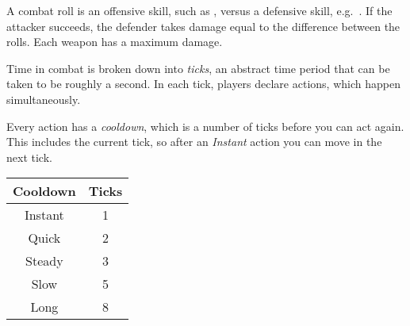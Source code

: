 
A combat roll is an offensive skill, such as , versus a defensive skill, e.g.\ . If the attacker succeeds, the defender takes damage equal to the difference between the rolls. Each weapon has a maximum damage.

Time in combat is broken down into \emph{ticks}, an abstract time period that can be taken to be roughly a second. In each tick, players declare actions, which happen simultaneously.

\begin{multicols}{2}

Every action has a \emph{cooldown}, which is a number of ticks before you can act again. This includes the current tick, so after an \emph{Instant} action you can move in the next tick.

\vfill\columnbreak

\begin{center}
\begin{tabular}{cc}
  Cooldown & Ticks \\
  \hline
  Instant  & 1     \\
  Quick    & 2     \\
  Steady   & 3     \\
  Slow     & 5     \\
  Long     & 8
\end{tabular}
\end{center}

\end{multicols}
